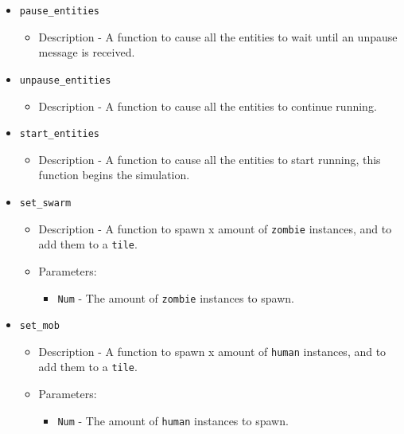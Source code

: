 \begin{itemize}
	\item {\tt pause\_entities}
		\begin{itemize}
			\item Description - A function to cause all the entities to wait until an unpause message is received.
		\end{itemize}

	\item {\tt unpause\_entities}
		\begin{itemize}
			\item Description - A function to cause all the entities to continue running.
		\end{itemize}

	\item {\tt start\_entities}
		\begin{itemize}
			\item Description - A function to cause all the entities to start running, this function begins the simulation.
		\end{itemize}

	\item {\tt set\_swarm}
		\begin{itemize}
			\item Description - A function to spawn x amount of \verb+zombie+ instances, and to add them to a \verb+tile+.
			\item Parameters:
				\begin{itemize}
					\item {\tt Num} - The amount of \verb+zombie+ instances to spawn.
				\end{itemize}
		\end{itemize}

	\item {\tt set\_mob}
		\begin{itemize}
			\item Description - A function to spawn x amount of \verb+human+ instances, and to add them to a \verb+tile+.
			\item Parameters:
				\begin{itemize}
					\item {\tt Num} - The amount of \verb+human+ instances to spawn.
				\end{itemize}
		\end{itemize}

\end{itemize}
\clearpage
\endinput